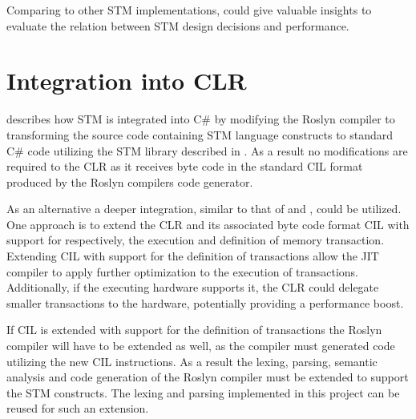 Comparing \stmname to other \ac{STM} implementations, could give valuable insights to evaluate the relation between \ac{STM} design decisions and performance.

\section{Integration into \acs{CLR}}
 describes how \ac{STM} is integrated into C\# by modifying the Roslyn compiler to transforming the source code containing \ac{STM} language constructs to standard C\# code utilizing the \ac{STM} library described in . As a result no modifications are required to the \ac{CLR} as it receives byte code in the standard \ac{CIL} format produced by the Roslyn compilers code generator.

As an alternative a deeper integration, similar to that of \cite{harris2003language} and \cite{duffy2010stmnet}, could be utilized. One approach is to extend the \ac{CLR} and its associated byte code format \ac{CIL} with support for respectively, the execution and definition of memory transaction. Extending \ac{CIL} with support for the definition of transactions allow the \ac{JIT} compiler to apply further optimization to the execution of transactions. Additionally, if the executing hardware supports it, the \ac{CLR} could delegate smaller transactions to the hardware, potentially providing a performance boost.

If \ac{CIL} is extended with support for the definition of transactions the Roslyn compiler will have to be extended as well, as the compiler must generated code utilizing the new \ac{CIL} instructions. As a result the lexing, parsing, semantic analysis and code generation of the Roslyn compiler must be extended to support the \ac{STM} constructs. The lexing and parsing implemented in this project can be reused for such an extension. 
 
